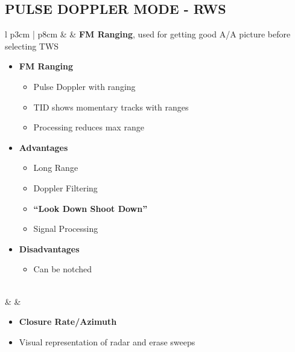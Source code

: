 \documentclass[8pt,usenames,dvipsnames,twoside]{article}
\begin{document}
	\subsection{PULSE DOPPLER MODE - RWS}
	\label{sec:awg9-rws}
	\begin{center}
		\begin{longtable}{l p{3cm} | p{8cm}}
			\toprule
			\textbullet &  & \textbf{FM Ranging}, used for getting good A/A picture before selecting TWS

			\begin{minipage}[t]{\linewidth}
				\vspace{-7pt}
				\begin{itemize}
					\item \textbf{FM Ranging}
					\begin{itemize}
						\item Pulse Doppler with ranging
						\item TID shows momentary tracks with ranges
						\item Processing reduces max range
					\end{itemize}
					\item \textbf{Advantages}
					\begin{itemize}
						\item Long Range
						\item Doppler Filtering
						\item \textbf{``Look Down Shoot Down''}
						\item Signal Processing
					\end{itemize}
					\item \textbf{Disadvantages}
					\begin{itemize}
						\item Can be notched
					\end{itemize}
				\end{itemize}
			\end{minipage} \\
			\midrule
			\textbullet &  &
			\begin{minipage}[t]{\linewidth}
				\vspace{-7pt}
				\begin{itemize}
					\item \textbf{Closure Rate/Azimuth}
					\item Visual representation of radar and erase sweeps
				\end{itemize}
			\end{minipage} \\

\end{longtable}
\end{center}
\end{document}
